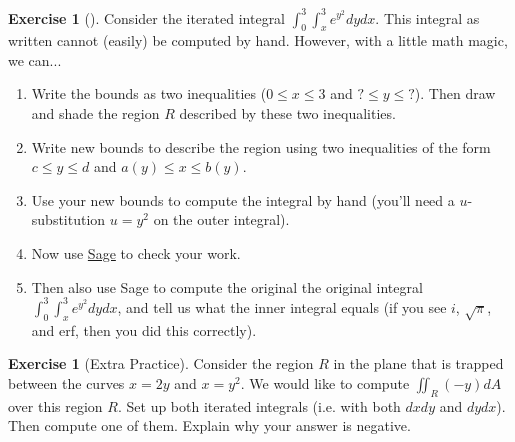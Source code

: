 \documentclass[10pt,]{book}
\theoremstyle{plain}
\theoremstyle{definition}
\theoremstyle{definition}
\theoremstyle{definition}
\theoremstyle{definition}
\newtheorem{exploration}[project]{Exercise}
\theoremstyle{definition}
\numberwithin{equation}{section}
\newcommand{\ds}{\displaystyle}
\begin{document}
\begin{exploration}[]\label{exploration-250}
Consider the iterated integral \(\ds \int_0^3\int_x^3 e^{y^2}dydx\). This integral as written cannot (easily) be computed by hand. However, with a little math magic, we can...%
\begin{enumerate}[font=\bfseries,label=(\alph*),ref=\alph*]
\item\label{task-693} Write the bounds as two inequalities (\(0\leq x\leq 3\) and \(?\leq y\leq ?\)). Then draw and shade the region \(R\) described by these two inequalities.%
\item\label{task-694} Write new bounds to describe the region using two inequalities of the form \(c\leq y\leq d\) and \(a(y)\leq x\leq b(y)\).%
\item\label{task-695} Use your new bounds to compute the integral by hand (you'll need a \(u\)-substitution \(u=y^2\) on the outer integral).%
\item\label{task-696} Now use \href{http://bmw.byuimath.com/dokuwiki/doku.php?id=double_integral_calculator}{Sage} to check your work.%
\item\label{task-697} Then also use Sage to compute the original the original integral \(\ds \int_0^3\int_x^3 e^{y^2}dydx\), and tell us what the inner integral equals (if you see \(i\), \(\sqrt{\pi}\), and erf, then you did this correctly).%
\end{enumerate}
\end{exploration}
\begin{exploration}[Extra Practice]\label{exploration-251}
Consider the region \(R\) in the plane that is trapped between the curves \(x=2y\) and \(x=y^2\). We would like to compute \(\iint_R (-y) dA\) over this region \(R\). Set up both iterated integrals (i.e. with both \(dxdy\) and \(dydx\)). Then compute one of them. Explain why your answer is negative.%
\end{exploration}
\typeout{************************************************}
\typeout{************************************************}
\end{document}
